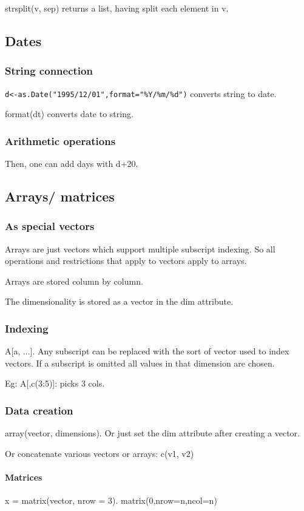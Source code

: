 \documentclass[oneside, article]{memoir}
\begin{document}
strsplit(v, sep) returns a list, having split each element in v.

\subsection{Dates}
\subsubsection{String connection}
\verb'd<-as.Date("1995/12/01",format="%Y/%m/%d")' converts string to date. 

format(dt) converts date to string.

\subsubsection{Arithmetic operations}
Then, one can add days with d+20.

\subsection{Arrays/ matrices}
\subsubsection{As special vectors}
Arrays are just vectors which support multiple subscript indexing. So all operations and restrictions that apply to vectors apply to arrays.

Arrays are stored column by column.

The dimensionality is stored as a vector in the dim attribute.

\subsubsection{Indexing}
A[a, ...]. Any subscript can be replaced with the sort of vector used to index vectors. If a subscript is omitted all values in that dimension are chosen.

Eg: A[,c(3:5)]: picks 3 cols.

\subsubsection{Data creation}
array(vector, dimensions). Or just set the dim attribute after creating a vector.

Or concatenate various vectors or arrays: c(v1, v2)

\paragraph{Matrices}
x = matrix(vector, nrow = 3).
matrix(0,nrow=n,ncol=n)
 
\end{document}
